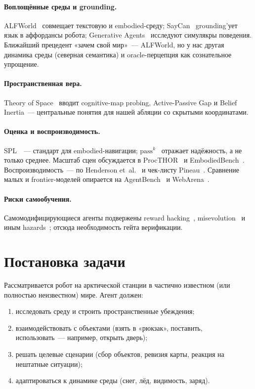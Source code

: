 \documentclass[11pt,a4paper]{article}
\begin{document}
\paragraph{Воплощённые среды и grounding.}
ALFWorld~\cite{shridhar2021alfworld} совмещает текстовую и embodied-среду;
SayCan~\cite{ahn2022saycan} grounding'ует язык в аффордансы робота;
Generative Agents~\cite{park2023generativeagents} исследуют симулякры поведения.
Ближайший прецедент «зачем свой мир»~--- ALFWorld, но у нас другая динамика
среды (северная семантика) и oracle-перцепция как сознательное упрощение.

\paragraph{Пространственная вера.}
Theory of Space~\cite{theoryofspace2026} вводит cognitive-map probing,
Active-Passive Gap и Belief Inertia~--- центральные понятия для нашей абляции
со скрытыми координатами.

\paragraph{Оценка и воспроизводимость.}
SPL~\cite{anderson2018spl}~--- стандарт для embodied-навигации;
\(\mathrm{pass}^k\)~\cite{taubench2024} отражает надёжность, а не только среднее.
Масштаб сцен обсуждается в ProcTHOR~\cite{deitke2022procthor} и
EmbodiedBench~\cite{embodiedbench2025}.
Воспроизводимость~--- по Henderson et~al.~\cite{henderson2018deeprl}
и чек-листу Pineau~\cite{pineau2018reproducibility}.
Сравнение малых и frontier-моделей опирается на AgentBench~\cite{liu2023agentbench}
и WebArena~\cite{zhou2023webarena}.

\paragraph{Риски самообучения.}
Самомодифицирующиеся агенты подвержены reward hacking~\cite{rewardhacking2025},
misevolution~\cite{misevolution2025} и иным hazards~\cite{selfimprovingrisks2025};
отсюда необходимость гейта верификации.

\section{Постановка задачи}
\label{sec:problem}

Рассматривается робот на арктической станции в частично известном
(или полностью неизвестном) мире.
Агент должен:
\begin{enumerate}[leftmargin=*]
  \item исследовать среду и строить пространственные убеждения;
  \item взаимодействовать с объектами (взять в «рюкзак», поставить,
        использовать~--- например, открыть дверь);
  \item решать целевые сценарии (сбор объектов, ревизия карты, реакция
        на нештатные ситуации);
  \item адаптироваться к динамике среды (снег, лёд, видимость, заряд).
\end{enumerate}
\end{document}
